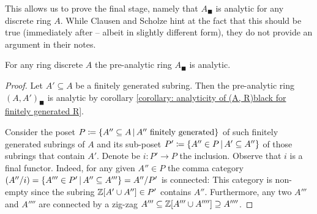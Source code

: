 This allows us to prove the final stage, namely that $A_\blacksquare$ is analytic for any discrete ring $A$. While Clausen and Scholze hint at the fact that this should be true (\eg immediately after \cite[Definition 9.1]{condenseddotpdf} -- albeit in slightly different form), they do not provide an argument in their notes.
\begin{theorem}
	\label{theorem: analyticity of Ablack for non-finite Z-algebras A}
	
	For any ring discrete $A$ the pre-analytic ring $A_\blacksquare$ is analytic.
\end{theorem}
\begin{proof}	
	Let $A'\subseteq A$ be a finitely generated subring. Then the pre-analytic ring $(A, A')_\blacksquare$ is analytic by corollary \ref{corollary: analyticity of (A, R)black for finitely generated R}.
	
	
	Consider the poset $P\coloneqq \{A''\subseteq A\,\vert\, A'' \text{ finitely generated}\}$ of such finitely generated subrings of $A$ and its sub-poset $P'\coloneqq \{A'' \in P\,\vert\, A'\subseteq A''\}$ of those subrings that contain $A'$. Denote be $i\colon P'\to P$ the inclusion. Observe that $i$ is a final functor. Indeed, for any given $A''\in P$ the comma category $(A''/i)=\{ A''' \in P'\,\vert\, A''\subseteq A'''\} = A''/P'$ is connected: This category is non-empty since the subring ${\mathbb{Z}}[A' \cup A''] \in P'$ contains $A''$. Furthermore, any two $A'''$ and $A''''$ are connected by a zig-zag $A'''\subseteq {\mathbb{Z}}[A'''\cup A''''] \supseteq A''''$. 
	

\end{proof}
